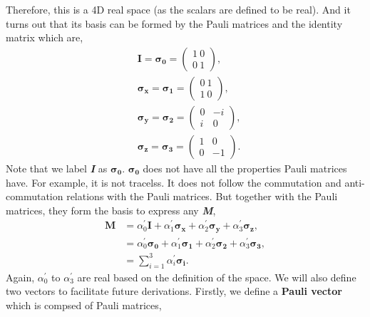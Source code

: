 \documentclass{article}
\newcommand{\bfit}[1]{\textit{\textbf{#1}}}
\begin{document}
Therefore, this is a 4D real space (as the scalars are defined to be real). And it
turns out that its basis can be formed by the Pauli matrices and the identity matrix
which are,
\begin{align*}\label{eq 6.2}
    &\boldsymbol{I}=\boldsymbol{\sigma_0}=\begin{pmatrix}
        1 \ 0\\ 0\ 1
    \end{pmatrix},\\
    &\boldsymbol{\sigma_x}=\boldsymbol{\sigma_1}=\begin{pmatrix}
        0\ 1\\ 1\ 0
    \end{pmatrix},\\
    &\boldsymbol{\sigma_y}=\boldsymbol{\sigma_2}=\begin{pmatrix}
        0 & -i\\i&0
    \end{pmatrix},\\
    &\boldsymbol{\sigma_z}=\boldsymbol{\sigma_3}=\begin{pmatrix}
        1 &0\\ 0&-1
    \end{pmatrix}. \tag{6.2}
\end{align*}
Note that we label \bfit{I} as $\boldsymbol{\sigma_0}$. $\boldsymbol{\sigma_0}$ does not
have all the properties Pauli matrices have. For example, it is not tracelss. It does not
follow the commutation and anti-commutation relations with the Pauli matrices. But together
with the Pauli matrices, they form the basis to express any \bfit{M},
\begin{align*}\label{eq 6.3}
    \boldsymbol{M}&=\alpha_0^\prime\boldsymbol{I}+\alpha_1^\prime\boldsymbol{\sigma_x}
    +\alpha_2^\prime\boldsymbol{\sigma_y}+\alpha_3^\prime\boldsymbol{\sigma_z},\\
    &=\alpha_0^\prime\boldsymbol{\sigma_0}+\alpha_1^\prime\boldsymbol{\sigma_1}
    +\alpha_2^\prime\boldsymbol{\sigma_2}+\alpha_3^\prime\boldsymbol{\sigma_3},\\
    &=\sum_{i=1}^{3}\alpha_i^\prime\boldsymbol{\sigma_i}.\tag{6.3}
\end{align*}
Again, $\alpha_0^\prime$ to $\alpha_3^\prime$ are real based on the definition of the space.
We will also define two vectors to facilitate future derivations.
Firstly, we define a \textbf{Pauli vector} which is compsed of Pauli matrices,
\end{document}
